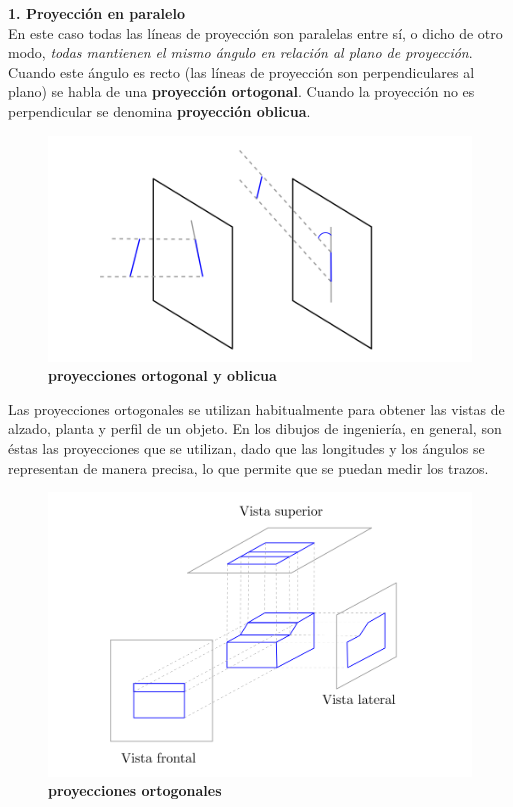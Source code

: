 \textbf{1. Proyección en paralelo }\\
En este caso todas las líneas de proyección son paralelas entre sí, o dicho de otro modo, \textit{todas mantienen el mismo ángulo en relación al plano de proyección}. Cuando este ángulo es recto (las líneas de proyección son perpendiculares al plano) se habla de una \textbf{proyección ortogonal}. Cuando la proyección no es perpendicular se denomina \textbf{proyección oblicua}.

\begin{figure}[h]
    \includegraphics[width=12cm]{Img/GEO/geo-per-2.png}
    \centering
    \caption{\footnotesize{\textbf{proyecciones ortogonal y oblicua}}}
    \label{geo-per2}
\end{figure}

Las proyecciones ortogonales se utilizan habitualmente para obtener las vistas de alzado, planta y perfil de un objeto. En los dibujos de ingeniería, en general, son éstas las proyecciones que se utilizan, dado que las longitudes y los ángulos se representan de manera precisa, lo que permite que se puedan medir los trazos.

\begin{figure}[h]
    \includegraphics[width=12cm]{Img/GEO/geo-per-3.png}
    \centering
    \caption{\footnotesize{\textbf{proyecciones ortogonales}}}
    \label{geo-per3}
\end{figure}

